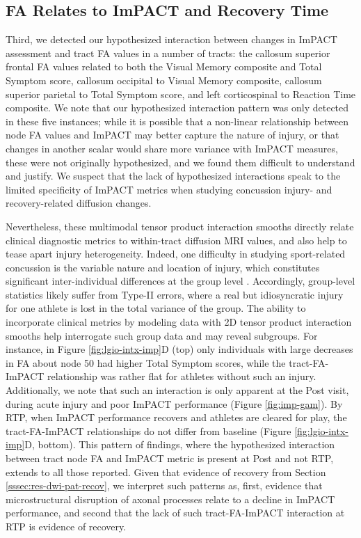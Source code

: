 \documentclass[12pt]{article}
\begin{document}
\subsection{FA Relates to ImPACT and Recovery Time}
\label{ssec:disc-impact}
Third, we detected our hypothesized interaction between changes in ImPACT assessment and tract FA values in a number of tracts: the callosum superior frontal FA values related to both the Visual Memory composite and Total Symptom score, callosum occipital to Visual Memory composite, callosum superior parietal to Total Symptom score, and left corticospinal to Reaction Time composite. We note that our hypothesized interaction pattern was only detected in these five instances; while it is possible that a non-linear relationship between node FA values and ImPACT may better capture the nature of injury, or that changes in another scalar would share more variance with ImPACT measures, these were not originally hypothesized, and we found them difficult to understand and justify. We suspect that the lack of hypothesized interactions speak to the limited specificity of ImPACT metrics \parencite{schatz2013SensitivitySpecificityOnline} when studying concussion injury- and recovery-related diffusion changes.

Nevertheless, these multimodal tensor product interaction smooths directly relate clinical diagnostic metrics to within-tract diffusion MRI values, and also help to tease apart injury heterogeneity. Indeed, one difficulty in studying sport-related concussion is the variable nature and location of injury, which constitutes significant inter-individual differences at the group level \parencite{lindsey2023DiffusionWeightedImagingMild}. Accordingly, group-level statistics likely suffer from Type-II errors, where a real but idiosyncratic injury for one athlete is lost in the total variance of the group. The ability to incorporate clinical metrics by modeling data with 2D tensor product interaction smooths help interrogate such group data and may reveal subgroups. For instance, in Figure \ref{fig:lgio-intx-imp}D (top) only individuals with large decreases in FA about node 50 had higher Total Symptom scores, while the tract-FA-ImPACT relationship was rather flat for athletes without such an injury. Additionally, we note that such an interaction is only apparent at the Post visit, during acute injury and poor ImPACT performance (Figure \ref{fig:imp-gam}). By RTP, when ImPACT performance recovers and athletes are cleared for play, the tract-FA-ImPACT relationships do not differ from baseline (Figure \ref{fig:lgio-intx-imp}D, bottom). This pattern of findings, where the hypothesized interaction between tract node FA and ImPACT metric is present at Post and not RTP, extends to all those reported. Given that evidence of recovery from Section \ref{sssec:res-dwi-pat-recov}, we interpret such patterns as, first, evidence that microstructural disruption of axonal processes relate to a decline in ImPACT performance, and second that the lack of such tract-FA-ImPACT interaction at RTP is evidence of recovery.
\end{document}
